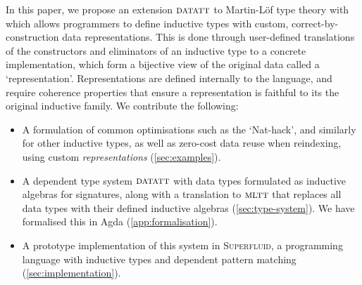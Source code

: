 In this paper, we propose an extension ${\textsc{datatt}}$ to Martin-L\"of type theory with
which allows programmers to define inductive types with custom,
correct-by-construction data representations. This is done through user-defined
translations of the constructors and eliminators of an inductive type to a
concrete implementation, which form a bijective view of the original data called
a `representation'. Representations are defined internally to the language, and
require coherence properties that ensure a representation is faithful to its the
original inductive family. We contribute the following:
\begin{itemize}
    \item A formulation of common optimisations such as the `Nat-hack', and
        similarly for other inductive types, as well as zero-cost data reuse when
        reindexing, using custom \emph{representations} (\cref{sec:examples}).
        \item A dependent type system ${\textsc{datatt}}$ with data types formulated
        as inductive algebras for signatures, along with a translation to
        ${\textsc{mltt}}$ that replaces all data types with their defined inductive
        algebras (\cref{sec:type-system}). We have formalised this in Agda (\cref{app:formalisation}).
        \item A prototype implementation of this system in \textsc{Superfluid},
        a programming language with inductive types and dependent pattern
        matching (\cref{sec:implementation}).
\end{itemize}
